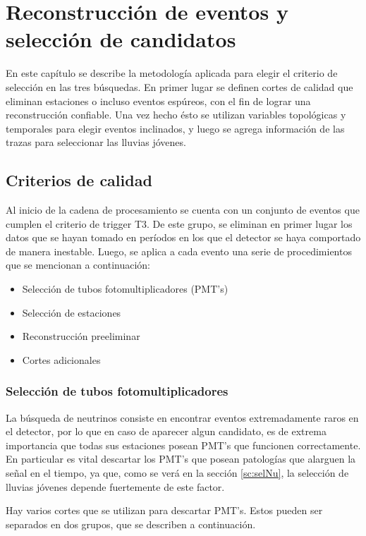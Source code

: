 \chapter{Reconstrucci\'on de eventos y selecci\'on de candidatos}
\label{ch:selAuger}

En este capítulo se describe la metodología aplicada para elegir el criterio de selección en las tres búsquedas.
En primer lugar se definen cortes de calidad que eliminan estaciones o incluso eventos espúreos, con el fin de lograr una reconstrucción confiable.
Una vez hecho ésto se utilizan variables topológicas y temporales para elegir eventos inclinados, y luego  se agrega información de las trazas para seleccionar las lluvias jóvenes.

\section{Criterios de calidad}

	Al inicio de la cadena de procesamiento se cuenta con un conjunto de eventos que cumplen el criterio de trigger T3.
	De este grupo, se eliminan en primer lugar los datos que se hayan tomado en períodos en los que el detector se haya comportado de manera inestable\cite{pmtsAuger}.
	Luego, se aplica a cada evento una serie de procedimientos que se mencionan a continuación:
	\begin{itemize}
	 \item Selección de tubos fotomultiplicadores (PMT's)
	 \item Selección de estaciones
	 \item Reconstrucción preeliminar
	 \item Cortes adicionales
	\end{itemize}
	
	\subsection{Selección de tubos fotomultiplicadores}
	
	La búsqueda de neutrinos consiste en encontrar eventos extremadamente raros en el detector, por lo que en caso de aparecer algun candidato, es de extrema importancia que todas sus estaciones posean PMT's que funcionen correctamente.
	En particular es vital descartar los PMT's que posean patologías que alarguen la señal en el tiempo, ya que, como se verá en la sección \ref{sc:selNu}, la selección de lluvias jóvenes depende fuertemente de este factor.
	
	Hay varios cortes que se utilizan para descartar PMT's. 
	Estos pueden ser separados en dos grupos, que se describen a continuación.
	
